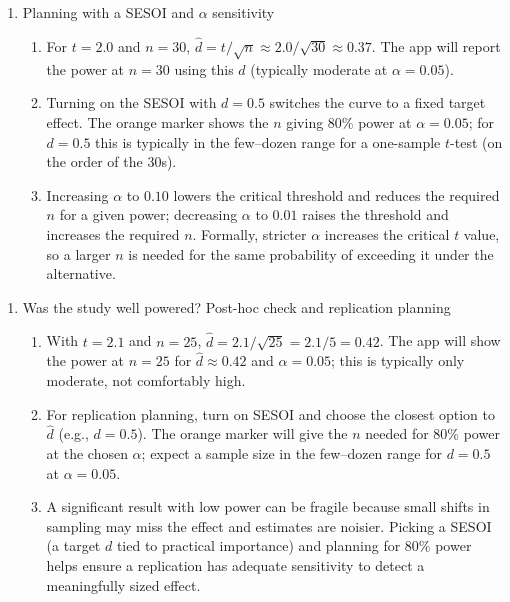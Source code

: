 \documentclass[12pt,a4paper]{article}
\providecommand{\tightlist}{%
  \setlength{\itemsep}{0pt}\setlength{\parskip}{0pt}}
\begin{document}
\begin{enumerate}
\def\labelenumi{\arabic{enumi}.}
\setcounter{enumi}{1}
\tightlist
\item
  Planning with a SESOI and \(\alpha\) sensitivity

  \begin{enumerate}
  \def\labelenumii{\alph{enumii}.}
  \tightlist
  \item
    For \(t=2.0\) and \(n=30\),
    \(\hat d = t/\sqrt{n} \approx 2.0/\sqrt{30} \approx 0.37\). The app
    will report the power at \(n=30\) using this \(\hat d\) (typically
    moderate at \(\alpha=0.05\)).
  \item
    Turning on the SESOI with \(d=0.5\) switches the curve to a fixed
    target effect. The orange marker shows the \(n\) giving \(80\%\)
    power at \(\alpha=0.05\); for \(d=0.5\) this is typically in the
    few--dozen range for a one-sample \(t\)-test (on the order of the
    30s).
  \item
    Increasing \(\alpha\) to \(0.10\) lowers the critical threshold and
    reduces the required \(n\) for a given power; decreasing \(\alpha\)
    to \(0.01\) raises the threshold and increases the required \(n\).
    Formally, stricter \(\alpha\) increases the critical \(t\) value, so
    a larger \(n\) is needed for the same probability of exceeding it
    under the alternative.
  \end{enumerate}
\end{enumerate}

\bigskip

\begin{enumerate}
\def\labelenumi{\arabic{enumi}.}
\setcounter{enumi}{2}
\tightlist
\item
  Was the study well powered? Post-hoc check and replication planning

  \begin{enumerate}
  \def\labelenumii{\alph{enumii}.}
  \tightlist
  \item
    With \(t=2.1\) and \(n=25\),
    \(\hat d = 2.1/\sqrt{25} = 2.1/5 = 0.42\). The app will show the
    power at \(n=25\) for \(\hat d \approx 0.42\) and \(\alpha=0.05\);
    this is typically only moderate, not comfortably high.
  \item
    For replication planning, turn on SESOI and choose the closest
    option to \(\hat d\) (e.g., \(d=0.5\)). The orange marker will give
    the \(n\) needed for \(80\%\) power at the chosen \(\alpha\); expect
    a sample size in the few--dozen range for \(d=0.5\) at
    \(\alpha=0.05\).
  \item
    A significant result with low power can be fragile because small
    shifts in sampling may miss the effect and estimates are noisier.
    Picking a SESOI (a target \(d\) tied to practical importance) and
    planning for \(80\%\) power helps ensure a replication has adequate
    sensitivity to detect a meaningfully sized effect.
  \end{enumerate}
\end{enumerate}
\end{document}
